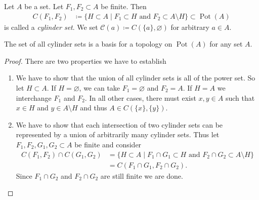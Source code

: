 \begin{defin}
  \label{def:pot-top}
  Let \(A\) be a set. Let \(F_1, F_2 \subset A\) be finite. Then
  \begin{align*}
    C(F_1, F_2) & \coloneqq \{ H \subset A \mid F_1 \subset H \text{ and } F_2 \subset A \setminus H\} \subset \operatorname{Pot}(A)
  \end{align*}
  is called a \emph{cylinder set}. We set \(\mathcal{C}(a) \coloneqq C(\{a\}, \varnothing)\) for arbitrary \(a \in A\).
\end{defin}

\begin{prop}
  \label{prop:pot-top}
  The set of all cylinder sets is a basis for a topology on \(\operatorname{Pot}(A)\) for any set \(A\).
\end{prop}

\begin{proof}
  There are two properties we have to establish
  \begin{enumerate}
  \item We have to show that the union of all cylinder sets is all of the power set. So let \(H \subset A\). If \(H = \varnothing\), we can take \(F_1 = \varnothing\) and \(F_2 = A\). If \(H = A\) we interchange \(F_1\) and \(F_2\). In all other cases, there must exist \(x,y \in A\) such that \(x \in H\) and \(y \in A \setminus H\) and thus \(A \in C(\{x\}, \{y\})\).
  \item We have to show that each intersection of two cylinder sets can be represented by a union of arbitrarily many cylinder sets. Thus let \(F_1, F_2, G_1, G_2 \subset A\) be finite and consider
  \begin{align*}
    C(F_1, F_2) \cap C(G_1, G_2)
    & = \{H \subset A \mid F_1 \cap G_1 \subset H \text{ and } F_2 \cap G_2 \subset A \setminus H\}\\
    & = C(F_1 \cap G_1, F_2 \cap G_2).
  \end{align*}
  Since \(F_1 \cap G_2\) and \(F_2 \cap G_2\) are still finite we are done.
  \end{enumerate}
\end{proof}

